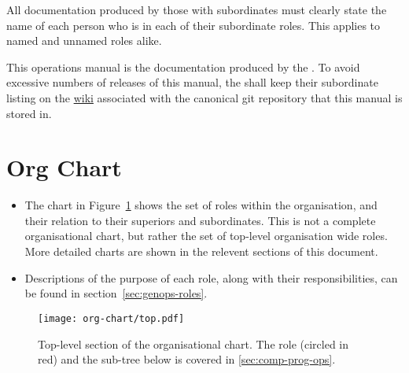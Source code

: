 All documentation produced by those with subordinates must clearly state the name of each person who is in each of their subordinate roles.  This applies to named and unnamed roles alike.

This operations manual is the documentation produced by the .  To avoid excessive numbers of releases of this manual, the  shall keep their subordinate listing on the \href{https://bitbucket.org/srobo/ops-manual/wiki/Home}{wiki} associated with the canonical git repository that this manual is stored in.

\section{Org Chart}
\label{sec:org-chart}

\begin{itemize}
\item The chart in Figure~\ref{fig:org-chart-top} shows the set of roles within the organisation, and their relation to their superiors and subordinates. This is not a complete organisational chart, but rather the set of top-level organisation wide roles. More detailed charts are shown in the relevent sections of this document.

\item Descriptions of the purpose of each role, along with their responsibilities, can be found in section~\ref{sec:genops-roles}.

\end{itemize}

\begin{figure}[h]
  \begin{center}
    \texttt{[image: org-chart/top.pdf]}
  \end{center}
  \caption{\label{fig:org-chart-top}Top-level section of the organisational chart. The  role (circled in red) and the sub-tree below is covered in \autoref{sec:comp-prog-ops}.}
\end{figure}

